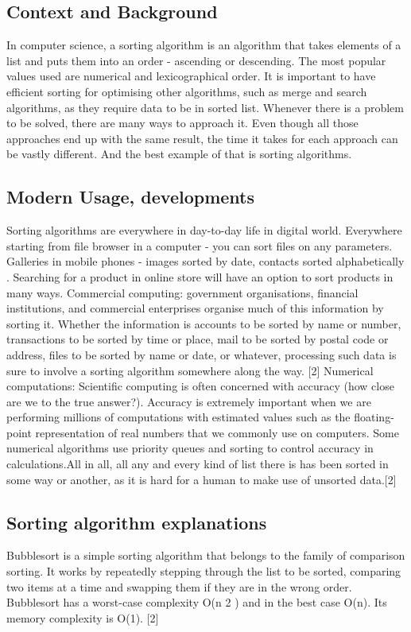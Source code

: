 \documentclass[]{report}
\begin{document}
\subsection{Context and Background}
	In computer science, a sorting algorithm is an algorithm that takes elements of a list and puts them into an order - ascending or descending. The most popular values used are numerical and lexicographical order. It is important to have efficient sorting for optimising other algorithms, such as merge and search algorithms, as they require data to be in sorted list.
	Whenever there is a problem to be solved, there are many ways to approach it. Even though all those approaches end up with the same result, the time it takes for each approach can be vastly different. And the best example of that is sorting algorithms.  
		
		\subsection{Modern Usage, developments}
		
		Sorting algorithms are everywhere in day-to-day life in digital world. Everywhere starting from file browser in a computer - you can sort files on any parameters. Galleries in mobile phones - images sorted by date, contacts sorted alphabetically . Searching for a product in online store will have an option to sort products in many ways. 
		Commercial computing: government organisations, financial institutions, and commercial enterprises organise much of this information by sorting it. Whether the information is accounts to be sorted by name or number, transactions to be sorted by time or place, mail to be sorted by postal code or address, files to be sorted by name or date, or whatever, processing such data is sure to involve a sorting algorithm somewhere along the way. [2]
		Numerical computations: Scientific computing is often concerned with accuracy (how close are we to the true answer?). Accuracy is extremely important when we are performing millions of computations with estimated values such as the floating-point representation of real numbers that we commonly use on computers. Some numerical algorithms use priority queues and sorting to control accuracy in calculations.All in all, all any and every kind of list there is has been sorted in some way or another, as it is hard for a human to make use of unsorted data.[2]
		
\subsection{Sorting algorithm explanations}
		Bubblesort is a simple sorting algorithm that belongs to the family of comparison sorting. It works by repeatedly stepping through the list to be sorted, comparing two items at a time and swapping them if they are in the wrong order. Bubblesort has a worst-case complexity O(n 2 ) and in the best case O(n). Its memory complexity is O(1). [2]
\end{document}
